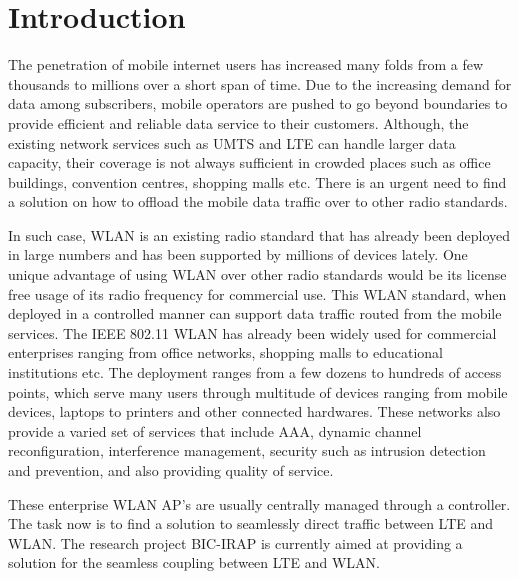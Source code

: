
\chapter{Introduction}\label{ch:introduction}
\sffamily{}
The penetration of mobile internet users has increased many folds from a few thousands to millions over a short span of time. Due to the increasing demand for data among subscribers, mobile operators are pushed to go beyond boundaries to provide efficient and reliable data service to their customers. Although, the existing network services such as \gls{UMTS} and \gls{LTE} can handle larger data capacity, their coverage is not always sufficient in crowded places such as office buildings, convention centres, shopping malls etc. There is an urgent need to find a solution on how to offload the mobile data traffic over to other radio standards.

In such case, \gls{WLAN} is an existing radio standard that has already been deployed in large numbers and has been supported by millions of devices lately. One unique advantage of using WLAN over other radio standards would be its license free usage of its radio frequency for commercial use. This WLAN standard, when deployed in a controlled manner can support data traffic routed from the mobile services. The IEEE 802.11 WLAN has already been widely used for commercial enterprises ranging from office networks, shopping malls to educational institutions etc. The deployment ranges from a few dozens to hundreds of access points, which serve many users through multitude of devices ranging from mobile devices, laptops to printers and other connected hardwares. These networks also provide a varied set of services that include \gls{AAA}, dynamic channel reconfiguration, interference management, security such as intrusion detection and prevention, and also providing quality of service. 

These enterprise WLAN AP’s are usually centrally managed through a controller. The task now is to find a solution to seamlessly direct traffic between LTE and WLAN. The research project \gls{BIC-IRAP} is currently aimed at providing a solution for the seamless coupling between LTE and WLAN.


